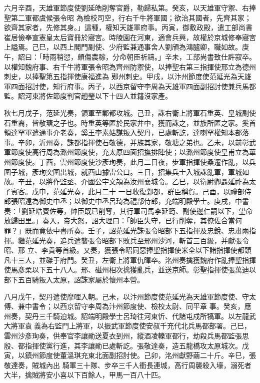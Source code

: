 \begin{pinyinscope}
 六月辛酉，天雄軍節度使劉延皓削奪官爵，勒歸私第。癸亥，以天雄軍守禦、右捧聖第二軍都虞候張令昭
 為檢校司空，行右千牛將軍國；欲治其國者，先齊其家；欲齊其家者，先修其身。」這種，權知天雄軍府事。丙寅，御敷政殿，遣工部尚書崔居儉奉宣憲皇太后寶冊於寢宮。時陵園在河東，適會兵興，故權於京城修奉寢宮上謚焉。己巳，以西上閣門副使、少府監兼通事舍人劉頎為鴻臚卿，職如故。庚午，詔曰：「時雨稍愆，頗傷農稼，分命朝臣祈禱。」辛未，工部尚書致仕許寂卒。以權知魏府事、右千牛將軍張令昭為齊州防禦使，以捧聖右第三指揮使邢立為德州刺史，以捧聖第五指揮使康福進為
 鄚州刺史。甲戌，以汴州節度使范延光為天雄軍四面招討使，知行府事。丙子，以西京留守李周為天雄軍四面副招討使兼兵馬都監。詔河東將佐節度判官趙瑩以下十四人並籍沒家產。



 秋七月戊子，范延光奏，領軍至鄴都攻城。己丑，誅右衛上將軍石重英、皇城副使石重裔，皆敬瑭之子也。時重英等匿於民家井中，獲而誅之，並族所匿之家。奚首領達罕軍遣通事介老奏，奚王李素姑謀叛入契丹，已處斬訖，達喇罕權知本部落
 事。辛卯，沂州奏，誅都指揮使石敬德，并族其家，敬瑭之弟也。乙未，以前彰武軍節度使高行周為潞州節度使，充太原四面招撫排陣使；以潞州節度使皇甫立為華州節度使。丁酉，雲州節度使沙彥珣奏，此月二日夜，步軍指揮使桑遷作亂，以兵圍子城，彥珣突圍出城，就西山據雷公口。三日，招集兵士入城誅亂軍，軍城如故。辛丑，以將作監丞、介國公宇文頡為汝州襄城令。乙巳，以衛尉卿聶延祚為太子賓客。戊申，范延光奏，此月二十
 一日收復鄴都，群臣稱賀。己酉，以禮部侍郎張昭遠為御史中丞；以御史中丞呂琦為禮部侍郎，充端明殿學士。庚戌，中書奏：「劉延皓賓佐等，帥臣既已削奪，其行軍司馬李延筠、副使邊仁嗣以下，望命放歸田里。」奏入，帝大怒，詔大理曰：「帥臣失守，已行削奪，其僚佐合當何罪？」既而竟依中書所奏。壬子，詔范延光誅張令昭部下五指揮及忠銳、忠肅兩指揮。繼范延光奏，追兵遣襲張令昭部下敗兵至邢州沙河，斬首三百級，并獻張令昭、邢
 立、李貴等首級。又奏，獲張令昭同惡捧聖指揮使米全以下諸指揮使都頭凡十三人，並磔于府門。癸丑，左衛上將軍仇暉卒。洺州奏擒獲魏府作亂捧聖指揮使馬彥柔以下五十八人。邢、磁州相次擒獲亂兵，並送京師。彰聖指揮使張萬迪以部下五百騎叛入太原，詔誅家屬於懷州本營。



 八月戊午，契丹遣使摩哩入朝。己未，以汴州節度使范延光為天雄軍節度使、守太傅、兼中書令；以西京留守李周為汴州節度使、檢校太尉、同平章
 事。癸亥，應州奏，契丹三千騎迫城。詔端明殿學士呂琦往河東忻、代諸屯戍所犒軍。以左龍武大將軍袁義為右監門上將軍，以振武軍節度使安叔千充代北兵馬都部署。己巳，雲州沙彥珣奏，供奉官李讓勛送夏衣到州，縱酒凌轢軍都行，劫殺兵馬都監張思殷、都指揮使黨行進，其李讓勛已處斬訖。張敬達奏，造五龍橋攻太原城次。戊寅，以鎮州節度使董溫琪充東北面副招討使。己卯，洺州獻野繭二十斤。辛巳，張敬達奏，賊城內出
 騎軍三十隊、步卒三千人衝長連城，高行周襲殺入壕，溺死者大半，擒賊將安小喜以下百餘人，甲馬一百八十匹。




\end{pinyinscope}
